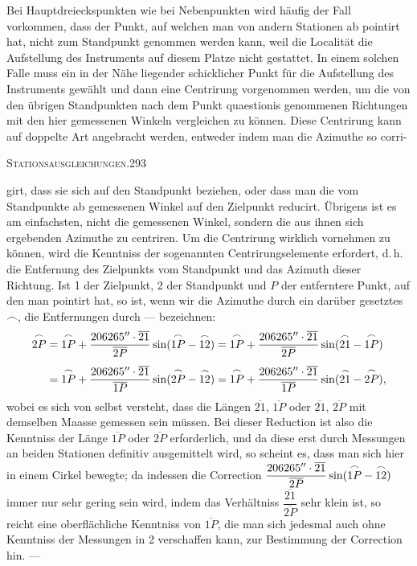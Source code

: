Bei Hauptdreieckspunkten wie bei Nebenpunkten wird häufig der Fall vorkommen, dass der Punkt, auf welchen man von andern Stationen ab pointirt hat, nicht zum Standpunkt genommen werden kann, weil die Localität die Aufstellung des Instruments auf diesem Platze nicht gestattet. In einem solchen Falle muss ein in der Nähe liegender schicklicher Punkt für die Aufstellung des Instruments gewählt und dann eine Centrirung vorgenommen werden, um die von den übrigen Standpunkten nach dem Punkt quaestionis genommenen Richtungen mit den hier gemessenen Winkeln vergleichen zu können. Diese Centrirung kann auf doppelte Art angebracht werden, entweder indem man die Azimuthe  so corri-

\clearpage
\noindent\mbox{}\hfill\textsc{Stationsausgleichungen.}\hfill293\par\medskip
\noindent girt, dass sie sich auf den Standpunkt beziehen, oder dass man die vom Standpunkte ab gemessenen Winkel auf den Zielpunkt reducirt. Übrigens ist es am einfachsten, nicht die gemessenen Winkel, sondern die aus ihnen sich ergebenden Azimuthe zu centriren. Um die Centrirung wirklich vornehmen zu können, wird die Kenntniss der sogenannten Centrirungselemente erfordert, d.\,h. die Entfernung des Zielpunkts vom Standpunkt und das Azimuth dieser Richtung. Ist 1 der Zielpunkt, 2 der Standpunkt und $P$ der entferntere Punkt, auf den man pointirt hat, so ist, wenn wir die Azimuthe durch ein darüber gesetztes $\frown$, die Entfernungen durch --- bezeichnen:
\[
\begin{aligned}
\overset{\frown}{2P}&=\overset{\frown}{1P}+\frac{206265''\cdot\overline{21}}{\overline{2P}}\sin(\overset{\frown}{1P}-\overset{\frown}{12})
=\overset{\frown}{1P}+\frac{206265''\cdot\overline{21}}{\overline{2P}}\sin(\overset{\frown}{21}-\overset{\frown}{1P})\\[4pt]
&=\overset{\frown}{1P}+\frac{206265''\cdot\overline{21}}{\overline{1P}}\sin(\overset{\frown}{2P}-\overset{\frown}{12})
=\overset{\frown}{1P}+\frac{206265''\cdot\overline{21}}{\overline{1P}}\sin(\overset{\frown}{21}-\overset{\frown}{2P}),
\end{aligned}
\]
wobei es sich von selbst versteht, dass die Längen $\overline{21}$, $\overline{1P}$ oder $\overline{21}$, $\overline{2P}$ mit demselben Maasse gemessen sein müssen. Bei dieser Reduction ist also die Kenntniss der Länge $\overline{1P}$ oder $\overline{2P}$ erforderlich, und da diese erst durch Messungen an beiden Stationen definitiv ausgemittelt wird, so scheint es, dass man sich hier in einem Cirkel bewegte; da indessen die Correction $\dfrac{206265''\cdot\overline{21}}{\overline{2P}}\sin(\overset{\frown}{1P}-\overset{\frown}{12})$ immer nur sehr gering sein wird, indem das Verhältniss $\dfrac{\overline{21}}{\overline{2P}}$ sehr klein ist, so reicht eine oberflächliche Kenntniss von $\overline{1P}$, die man sich jedesmal auch ohne Kenntniss der Messungen in 2 verschaffen kann, zur Bestimmung der Correction hin. ---

